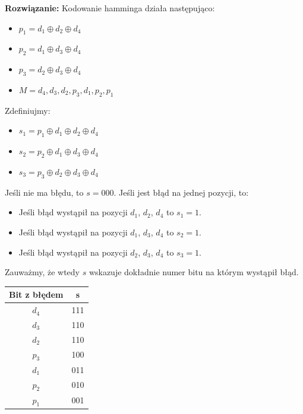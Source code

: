 \documentclass{article}
\begin{document}
\textbf{Rozwiązanie:} Kodowanie hamminga działa następująco:
\begin{itemize}
    \item $p_1 = d_1 \oplus d_2 \oplus d_4$
    \item $p_2 = d_1 \oplus d_3 \oplus d_4$
    \item $p_3 = d_2 \oplus d_3 \oplus d_4$
    \item $M = d_4, d_3, d_2, p_3, d_1, p_2, p_1$
\end{itemize}
Zdefiniujmy:
\begin{itemize}
    \item $s_1 = p_1 \oplus d_1 \oplus d_2 \oplus d_4$
    \item $s_2 = p_2 \oplus d_1 \oplus d_3 \oplus d_4$
    \item $s_3 = p_3 \oplus d_2 \oplus d_3 \oplus d_4$
\end{itemize}
Jeśli nie ma błędu, to $s=000$.
Jeśli jest błąd na jednej pozycji, to:
\begin{itemize}
    \item Jeśli błąd wystąpił na pozycji $d_1$, $d_2$, $d_4$ to $s_1=1$.
    \item Jeśli błąd wystąpił na pozycji $d_1$, $d_3$, $d_4$ to $s_2=1$.
    \item Jeśli błąd wystąpił na pozycji $d_2$, $d_3$, $d_4$ to $s_3=1$.
\end{itemize}
Zauważmy, że wtedy $s$ wskazuje dokładnie numer bitu na którym wystąpił błąd.
\begin{tabular}{|c|c|}
    \hline
    Bit z błędem & s \\ \hline
    $d_4$ & 111\\ \hline
    $d_3$ & 110\\ \hline
    $d_2$ & 110\\ \hline
    $p_3$ & 100\\ \hline
    $d_1$ & 011\\ \hline
    $p_2$ & 010\\ \hline
    $p_1$ & 001\\ \hline
\end{tabular}
\end{document}

